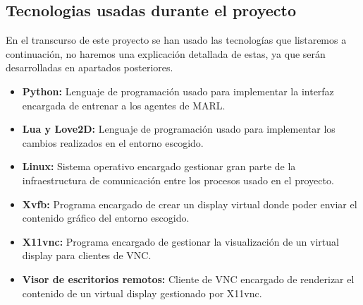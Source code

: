\subsection{Tecnologias usadas durante el proyecto}

En el transcurso de este proyecto se han usado las tecnologías que listaremos a continuación, no haremos una explicación detallada de estas, ya que serán desarrolladas en apartados posteriores.

\begin{itemize}
    \item \textbf{Python:} Lenguaje de programación usado para implementar la interfaz encargada de entrenar a los agentes de MARL.
    \item \textbf{Lua y Love2D:} Lenguaje de programación usado para implementar los cambios realizados en el entorno escogido.
    \item \textbf{Linux:} Sistema operativo encargado gestionar gran parte de la infraestructura de comunicación entre los procesos usado en el proyecto.
    \item \textbf{Xvfb:} Programa encargado de crear un display virtual donde poder enviar el contenido gráfico del entorno escogido.
    \item \textbf{X11vnc:} Programa encargado de gestionar la visualización de un virtual display para clientes de VNC.
    \item \textbf{Visor de escritorios remotos:} Cliente de VNC encargado de renderizar el contenido de un virtual display gestionado por X11vnc.
\end{itemize}

